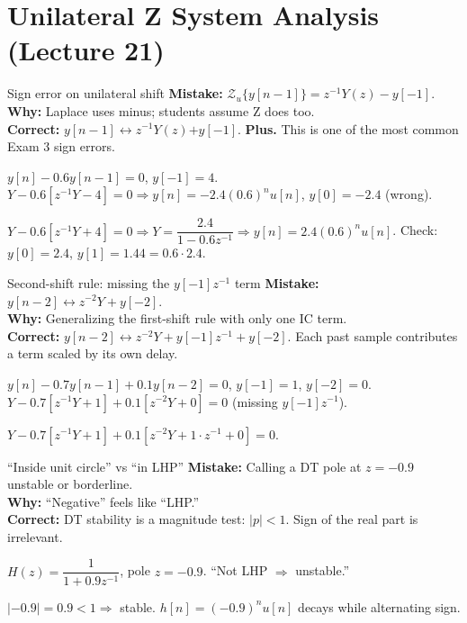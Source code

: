 \documentclass[11pt]{article}
\begin{document}
\section{Unilateral Z System Analysis (Lecture 21)}

\begin{pitfallbox}{Sign error on unilateral shift}
\textbf{Mistake:} $\mathcal{Z}_u\{y[n-1]\} = z^{-1} Y(z) - y[-1]$.\\
\textbf{Why:} Laplace uses minus; students assume Z does too.\\
\textbf{Correct:} $y[n-1] \leftrightarrow z^{-1}Y(z) \mathbf{+} y[-1]$. \textbf{Plus.} This is one of the most common Exam 3 sign errors.
\begin{wrongbox}
$y[n] - 0.6 y[n-1] = 0$, $y[-1]=4$. $Y - 0.6[z^{-1}Y - 4] = 0 \Rightarrow y[n] = -2.4(0.6)^n u[n]$, $y[0]=-2.4$ (wrong).
\end{wrongbox}
\begin{rightbox}
$Y - 0.6[z^{-1}Y + 4] = 0 \Rightarrow Y = \dfrac{2.4}{1-0.6z^{-1}} \Rightarrow y[n] = 2.4(0.6)^n u[n]$. Check: $y[0] = 2.4$, $y[1] = 1.44 = 0.6\cdot 2.4$. \checkmark
\end{rightbox}
\end{pitfallbox}

\begin{pitfallbox}{Second-shift rule: missing the $y[-1]z^{-1}$ term}
\textbf{Mistake:} $y[n-2] \leftrightarrow z^{-2}Y + y[-2]$.\\
\textbf{Why:} Generalizing the first-shift rule with only one IC term.\\
\textbf{Correct:} $y[n-2] \leftrightarrow z^{-2}Y + y[-1] z^{-1} + y[-2]$. Each past sample contributes a term scaled by its own delay.
\begin{wrongbox}
$y[n] - 0.7 y[n-1] + 0.1 y[n-2] = 0$, $y[-1]=1$, $y[-2]=0$.\\
$Y - 0.7[z^{-1}Y+1] + 0.1[z^{-2}Y+0] = 0$ (missing $y[-1]z^{-1}$).
\end{wrongbox}
\begin{rightbox}
$Y - 0.7[z^{-1}Y + 1] + 0.1[z^{-2}Y + 1\cdot z^{-1} + 0] = 0$.
\end{rightbox}
\end{pitfallbox}

\begin{pitfallbox}{``Inside unit circle'' vs ``in LHP''}
\textbf{Mistake:} Calling a DT pole at $z=-0.9$ unstable or borderline.\\
\textbf{Why:} ``Negative'' feels like ``LHP.''\\
\textbf{Correct:} DT stability is a magnitude test: $|p|<1$. Sign of the real part is irrelevant.
\begin{wrongbox}
$H(z) = \dfrac{1}{1+0.9z^{-1}}$, pole $z=-0.9$. ``Not LHP $\Rightarrow$ unstable.''
\end{wrongbox}
\begin{rightbox}
$|-0.9| = 0.9 < 1 \Rightarrow$ stable. $h[n] = (-0.9)^n u[n]$ decays while alternating sign.
\end{rightbox}
\end{pitfallbox}
\end{document}

